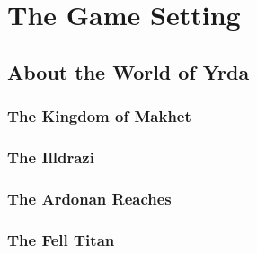 \chapter{The Game Setting}

\begin{multicols}{2}

\section{About the World of Yrda}

\subsection{The Kingdom of Makhet}

\subsection{The Illdrazi}

\subsection{The Ardonan Reaches}

\subsection{The Fell Titan}

\end{multicols}
